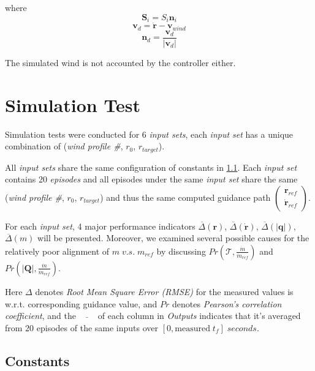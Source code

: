 \documentclass[10pt]{elsarticle}
\begin{document}
where 
\[
\boldsymbol{S}_i = S_i \boldsymbol{n}_i   
\]
\[
\boldsymbol{v}_{d} = \boldsymbol{\dot{r}} - \boldsymbol{v}_{wind}    
\]
\[
\boldsymbol{n}_{d} = \frac{\boldsymbol{v}_{d}}{|\boldsymbol{v}_{d}|}    
\]

The simulated wind is not accounted by the controller either.

\section{Simulation Test} \label{sec:simtest}
Simulation tests were conducted for 6 \textit{input sets}, each \textit{input set} has a unique combination of (\textit{wind profile \#}, $r_{0}$, $r_{target}$). 

All \textit{input sets} share the same configuration of constants in \cref{sec:const}. Each \textit{input set} contains 20 \textit{episodes} and all episodes under the same \textit{input set} share the same (\textit{wind profile \#}, $r_{0}$, $r_{target}$) and thus the same computed guidance path $\begin{pmatrix} \boldsymbol{r}_{ref} \\ \dot{\boldsymbol{r}}_{ref} \end{pmatrix}$. 

For each \textit{input set}, 4 major performance indicators $\overline{\Delta}(\boldsymbol{r})$, $\overline{\Delta}(\boldsymbol{\dot{r}})$, $\overline{\Delta}(|\boldsymbol{q}|)$, $\overline{\Delta}(m)$ will be presented. Moreover, we examined several possible causes for the relatively poor alignment of $m \; v.s. \; m_{ref}$ by discussing $Pr(\mathcal{T}, \frac{\dot{m}}{\dot{m}_{ref}})$ and ${Pr}(|\boldsymbol{Q}|, \frac{\dot{m}}{\dot{m}_{ref}})$.  

Here $\Delta$ denotes \textit{Root Mean Square Error (RMSE)} for the measured values is w.r.t. corresponding guidance value, and $Pr$ denotes \textit{Pearson's correlation coefficient}\cite{student1908probable}, and the $\text{ } \, \bar{} \, \text{ }$ of each column in \textit{Outputs} indicates that it's averaged from 20 episodes of the same inputs over $[0, \text{measured} \; t_{f}] \; seconds$. 

\subsection{Constants} \label{sec:const}
\end{document}
